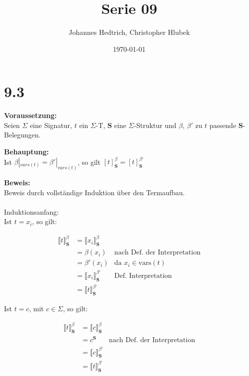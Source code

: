 \documentclass[12pt,a4paper]{scrartcl}
\title{Serie 09}
\author{Johannes Hedtrich, Christopher Hlubek}
\date{\today}
\begin{document}
  \section*{9.3}
  \noindent
  \textbf{Voraussetzung:}\\
  
  Seien $\Sigma$ eine Signatur, $t$ ein $\Sigma$-T, $\textbf{S}$ eine $\Sigma$-Struktur und $\beta$, $\beta'$ zu $t$ passende $\textbf{S}$-Belegungen.

  \noindent
  \textbf{Behauptung:}\\ 
  
  Ist $\beta|_{vars(t)} = \beta'|_{vars(t)}$, so gilt $[t]^{\beta}_{\textbf{S}} = [t]^{\beta'}_{\textbf{S}}$

  \noindent
  \textbf{Beweis:}\\
  
  Beweis durch vollständige Induktion über den Termaufbau.\\
  \\
  Induktionsanfang:\\
  Ist $t = x_i$, so gilt:
  
  \begin{align*}
  \llbracket t \rrbracket^{\beta}_{\textbf{S}} &= \llbracket x_i \rrbracket^{\beta}_{\textbf{S}}\\
                                               &= \beta(x_i) &\text{nach Def. der Interpretation}\\
                                               &= \beta'(x_i) &\text{da $x_i \in \text{vars}(t)$}\\
                                               &= \llbracket x_i \rrbracket^{\beta'}_{\textbf{S}} &\text{Def. Interpretation}\\
                                               &= \llbracket t \rrbracket^{\beta'}_{\textbf{S}}
  \end{align*}
  
  
  Ist $t = c$, mit $c \in \Sigma$, so gilt:
  
  \begin{align*}  
  \llbracket t \rrbracket^{\beta}_{\textbf{S}} &= \llbracket c \rrbracket^{\beta}_{\textbf{S}}\\
                                                &= c^{\textbf{S}} & \text{nach Def. der Interpretation}\\
                                                &= \llbracket c \rrbracket^{\beta'}_{\textbf{S}}\\
                                                &= \llbracket t \rrbracket^{\beta'}_{\textbf{S}}
  \end{align*}
  
\end{document}
